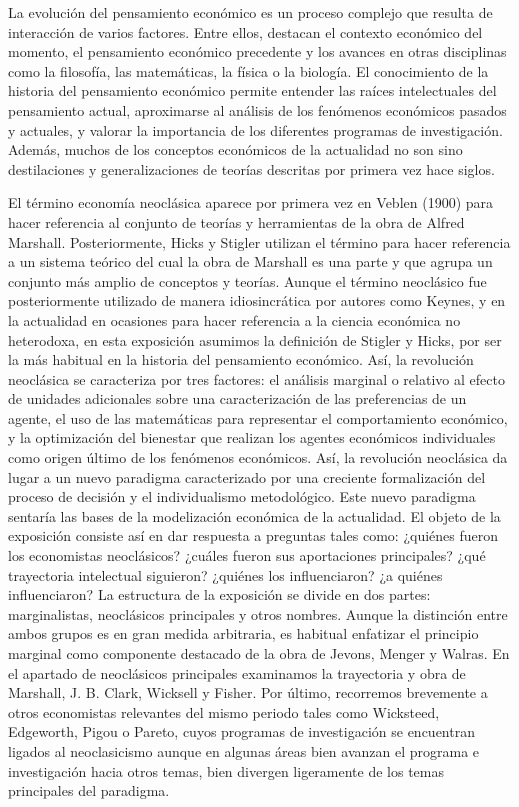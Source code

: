 \documentclass{nuevotema}
\begin{document}
\ideaclave

La evolución del pensamiento económico es un proceso complejo que resulta de interacción de varios factores. Entre ellos, destacan el contexto económico del momento, el pensamiento económico precedente y los avances en otras disciplinas como la filosofía, las matemáticas, la física o la biología. El conocimiento de la historia del pensamiento económico permite entender las raíces intelectuales del pensamiento actual, aproximarse al análisis de los fenómenos económicos pasados y actuales, y valorar la importancia de los diferentes programas de investigación. Además, muchos de los conceptos económicos de la actualidad no son sino destilaciones y generalizaciones de teorías descritas por primera vez hace siglos. 

El término economía neoclásica aparece por primera vez en Veblen (1900) para hacer referencia al conjunto de teorías y herramientas de la obra de Alfred Marshall. Posteriormente, Hicks y Stigler utilizan el término para hacer referencia a un sistema teórico del cual la obra de Marshall es una parte y que agrupa un conjunto más amplio de conceptos y teorías. Aunque el término neoclásico fue posteriormente utilizado de manera idiosincrática por autores como Keynes, y en la actualidad en ocasiones para hacer referencia a la ciencia económica no heterodoxa, en esta exposición asumimos la definición de Stigler y Hicks, por ser la más habitual en la historia del pensamiento económico. Así, la revolución neoclásica se caracteriza por tres factores: el análisis marginal o relativo al efecto de unidades adicionales sobre una caracterización de las preferencias de un agente, el uso de las matemáticas para representar el comportamiento económico, y la optimización del bienestar que realizan los agentes económicos individuales como origen último de los fenómenos económicos. Así, la revolución neoclásica da lugar a un nuevo paradigma caracterizado por una creciente formalización del proceso de decisión y el individualismo metodológico. Este nuevo paradigma sentaría las bases de la modelización económica de la actualidad. El objeto de la exposición consiste así en dar respuesta a preguntas tales como: ¿quiénes fueron los economistas neoclásicos? ¿cuáles fueron sus aportaciones principales? ¿qué trayectoria intelectual siguieron? ¿quiénes los influenciaron? ¿a quiénes influenciaron? La estructura de la exposición se divide en dos partes: marginalistas, neoclásicos principales y otros nombres. Aunque la distinción entre ambos grupos es en gran medida arbitraria, es habitual enfatizar el principio marginal como componente destacado de la obra de Jevons, Menger y Walras. En el apartado de neoclásicos principales examinamos la trayectoria y obra de Marshall, J. B. Clark, Wicksell y Fisher. Por último, recorremos brevemente a otros economistas relevantes del mismo periodo tales como Wicksteed, Edgeworth, Pigou o Pareto, cuyos programas de investigación se encuentran ligados al neoclasicismo aunque en algunas áreas bien avanzan el programa e investigación hacia otros temas, bien divergen ligeramente de los temas principales del paradigma. 
\end{document}
